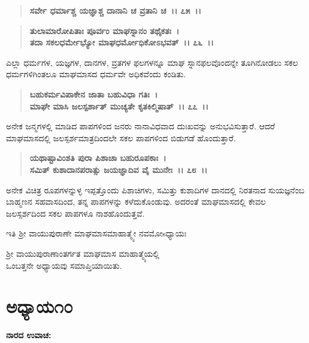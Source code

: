 \begin{verse}
\textbf{ಸರ್ವೇ ಧರ್ಮಾಶ್ಚ ಯಜ್ಞಾಶ್ಚ ದಾನಾನಿ ಚ ವ್ರತಾನಿ ಚ~।। ೭೫~।।} 
\end{verse}

\begin{verse}
\textbf{ತುಲಾಮಾರೋಪಿತಾಃ ಪೂರ್ವಂ ಮಾಘಸ್ನಾನಂ ತಥೈಕತಃ~।}\\\textbf{ತದಾ ಸಕಲಧರ್ಮೇಭ್ಯೋ ಮಾಘಧರ್ಮೋಧಿಕೋಽಭವತ್~।। ೭೬~।।}
\end{verse}

ಎಲ್ಲಾ ಧರ್ಮಗಳ, ಯಜ್ಞಗಳ, ದಾನಗಳ, ವ್ರತಗಳ ಫಲಗಳನ್ನೂ ಮಾಘ ಸ್ನಾನಫಲವೊಂದನ್ನೇ ತೂಗಿನೋಡಲು ಸಕಲ ಧರ್ಮಗಳಿಗಿಂತಲೂ ಮಾಘಮಾಸದ ಧರ್ಮವೇ ಅಧಿಕವೆಂದು ಕಂಡಿತು.

\begin{verse}
\textbf{ಬಹುಕರ್ಮವಿಪಾಕೇನ ಜಾತಾ ಬಹುವಿಧಾ ಗತಿಃ~।}\\\textbf{ಮಾಘೇ ಮಾಸಿ ಜಲಸ್ಪರ್ಶಾತ್ ಮುಚ್ಯತೇ ಕೃತಕಿಲ್ಮಿಷಾತ್~।। ೭೭~।।}
\end{verse}

ಅನೇಕ ಜನ್ಮಗಳಲ್ಲಿ ಮಾಡಿದ ಪಾಪಗಳಿಂದ ಜನರು ನಾನಾವಿಧವಾದ ದುಃಖವನ್ನು ಅನುಭವಿಸುತ್ತಾರೆ. ಆದರೆ ಮಾಘಮಾಸದಲ್ಲಿ ಜಲಸ್ಪರ್ಶಮಾತ್ರದಿಂದಲೇ ಸಕಲ ಪಾಪಗಳಿಂದ ಬಿಡುಗಡೆ ಹೊಂದುತ್ತಾರೆ.

\begin{verse}
\textbf{ಯಥಾಷ್ಟಾವಿಂಶತಿ ಪುರಾ ಪಿಶಾಚಾ ಬಹುರೂಪಕಾಃ~।}\\\textbf{ಸಮಿತ್ ಕುಶಾದಾನಪರಾತ್ಸು ಜಯಜ್ಞಾದಿವ ವೈ ಮುನೇಃ~।। ೭೮~।।}
\end{verse}

ಅನೇಕ ವಿಚಿತ್ರ ರೂಪಗಳನ್ನುಳ್ಳ ಇಪ್ಪತ್ತೊಂದು ಪಿಶಾಚಿಗಳು, ಸಮಿತ್ತು ಕುಶಾದಿಗಳ ದಾನದಲ್ಲಿ ನಿರತನಾದ ಸುಯಜ್ಞನೆಂಬ ಬಾಹ್ಮಣನ ಸಹವಾಸದಿಂದ, ತನ್ನ ಪಾಪಗಳನ್ನು ಕಳೆದುಕೊಂಡುವು. ಅದರಂತೆ ಮಾಘಮಾಸದಲ್ಲಿ ಕೇವಲ ಜಲಸ್ಪರ್ಶದಿಂದ ಸಕಲ ಪಾಪಗಳೂ ನಾಶಹೊಂದುತ್ತವೆ.

\begin{center}
ಇತಿ ಶ‍್ರೀ ವಾಯುಪುರಾಣೇ ಮಾಘಮಾಸಮಾಹಾತ್ಮ್ಯೇ ನವಮೋsಧ್ಯಾಯಃ 
\end{center}

\begin{center}
ಶ‍್ರೀ ವಾಯುಪುರಾಣಾಂತರ್ಗತ ಮಾಘಮಾಸ ಮಾಹಾತ್ಮ್ಯೆಯಲ್ಲಿ \\ ಒಂಬತ್ತನೇ ಅಧ್ಯಾಯವು ಸಮಾಪ್ತಿಯಾಯಿತು.
\end{center}

\newpage

\section*{ಅಧ್ಯಾಯ\enginline{-}೧೦}

\emptypage

\begin{flushleft}
\textbf{ನಾರದ ಉವಾಚ:\enginline{-} }
\end{flushleft}

